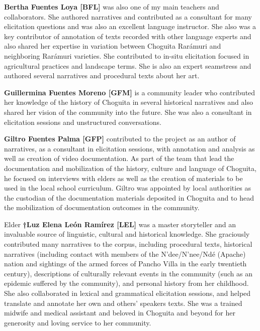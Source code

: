 \medskip

\noindent \textbf{Bertha Fuentes Loya [BFL]} was also one of my main teachers and collaborators. She authored narratives and contributed as a consultant for many elicitation questions and was also an excellent language instructor. She also was a key contributor of annotation of texts recorded with other language experts and also shared her expertise in variation between Choguita Rarámuri and neighboring Rarámuri varieties. She contributed to in-situ elicitation focused in agricultural practices and landscape terms. She is also an expert seamstress and authored several narratives and procedural texts about her art.

\medskip

\noindent \textbf{Guillermina Fuentes Moreno [GFM]} is a community leader who contributed her knowledge of the history of Choguita in several historical narratives and also shared her vision of the community into the future. She was also a consultant in elicitation sessions and unstructured conversations.

\medskip

\noindent \textbf{Giltro Fuentes Palma [GFP]} contributed to the project as an author of narratives, as a consultant in elicitation sessions, with annotation and analysis as well as creation of video documentation. As part of the team that lead the documentation and mobilization of the history, culture and language of Choguita, he focused on interviews with elders as well as the creation of materials to be used in the local school curriculum. Giltro was appointed by local authorities as the custodian of the documentation materials deposited in Choguita and to head the mobilization of
documentation outcomes in the community.

\medskip

\noindent Elder \textbf{†Luz Elena León Ramírez [LEL]} was a master storyteller and an invaluable source of linguistic, cultural and historical knowledge. She graciously contributed many narratives to the corpus, including procedural texts, historical narratives (including contact with members of the N’dee/N’nee/Ndé (Apache) nation and sightings of the armed forces of Pancho Villa in the early twentieth century), descriptions of culturally relevant events in the community (such as an epidemic suffered by the community), and personal history from her childhood. She also collaborated in lexical and grammatical elicitation sessions, and helped translate and annotate her own and others' speakers texts. She was a trained midwife and medical assistant and beloved in Choguita and beyond for her generosity and loving service to her community.

